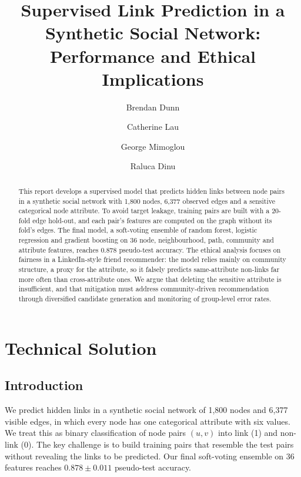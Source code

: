 \documentclass[runningheads]{llncs}
\begin{document}
%
\title{Supervised Link Prediction in a Synthetic Social Network: Performance and Ethical Implications}
%
\author{
Brendan Dunn\and
Catherine Lau\and
George Mimoglou\and
Raluca Dinu
}
%
%
\maketitle

\begin{abstract}
This report develops a supervised model that predicts hidden links between node pairs in a synthetic social network with 1,800 nodes, 6,377 observed edges and a sensitive categorical node attribute. To avoid target leakage, training pairs are built with a 20-fold edge hold-out, and each pair's features are computed on the graph without its fold's edges. The final model, a soft-voting ensemble of random forest, logistic regression and gradient boosting on 36 node, neighbourhood, path, community and attribute features, reaches 0.878 pseudo-test accuracy. The ethical analysis focuses on fairness in a LinkedIn-style friend recommender: the model relies mainly on community structure, a proxy for the attribute, so it falsely predicts same-attribute non-links far more often than cross-attribute ones. We argue that deleting the sensitive attribute is insufficient, and that mitigation must address community-driven recommendation through diversified candidate generation and monitoring of group-level error rates.

\end{abstract}

\section{Technical Solution}

\subsection{Introduction}
\label{Introduction}
We predict hidden links in a synthetic social network of 1,800 nodes and 6,377 visible edges, in which every node has one categorical attribute with six values. We treat this as binary classification of node pairs $(u,v)$ into link (1) and non-link (0). The key challenge is to build training pairs that resemble the test pairs without revealing the links to be predicted. Our final soft-voting ensemble on 36 features reaches $0.878 \pm 0.011$ pseudo-test accuracy.
\end{document}
